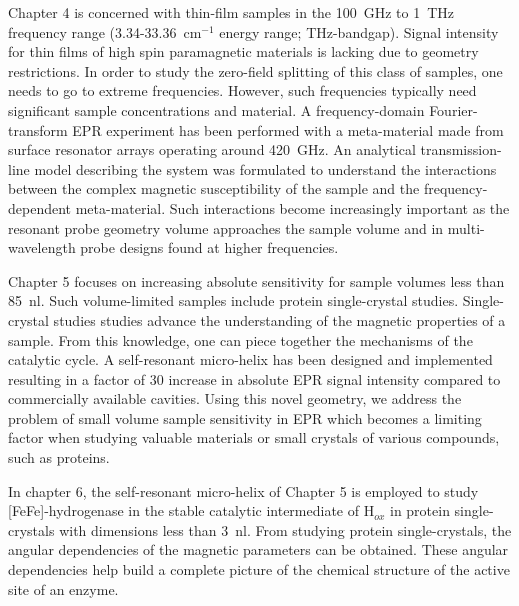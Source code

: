 Chapter 4 is concerned with thin-film samples in the 100~GHz to 1~THz frequency range (3.34-33.36~cm$^{-1}$ energy range; THz-bandgap). Signal intensity for thin films of high spin paramagnetic materials is lacking due to geometry restrictions. In order to study the zero-field splitting of this class of samples, one needs to go to extreme frequencies. However, such frequencies typically need significant sample concentrations and material. A frequency-domain Fourier-transform EPR experiment has been performed with a meta-material made from surface resonator arrays operating around 420~GHz. An analytical transmission-line model describing the system was formulated to understand the interactions between the complex magnetic susceptibility of the sample and the frequency-dependent meta-material. Such interactions become increasingly important as the resonant probe geometry volume approaches the sample volume and in multi-wavelength probe designs found at higher frequencies. 

Chapter 5 focuses on increasing absolute sensitivity for sample volumes less than 85~nl. Such volume-limited samples include protein single-crystal studies. Single-crystal studies studies advance the understanding of the magnetic properties of a sample. From this knowledge, one can piece together the mechanisms of the catalytic cycle. A self-resonant micro-helix has been designed and implemented resulting in a factor of 30 increase in absolute EPR signal intensity compared to commercially available cavities. Using this novel geometry, we address the problem of small volume sample sensitivity in EPR which becomes a limiting factor when studying valuable materials or small crystals of various compounds, such as proteins. 

In chapter 6, the self-resonant micro-helix of Chapter 5 is employed to study [FeFe]-hydrogenase in the stable catalytic intermediate of H$_{ox}$ in protein single-crystals with dimensions less than 3~nl. From studying protein single-crystals, the angular dependencies of the magnetic parameters can be obtained. These angular dependencies help build a complete picture of the chemical structure of the active site of an enzyme.







{\renewcommand{\bibsection}{\clearpage\section*{\bibname}\markboth{\bibname}{\bibname}}
\renewcommand{\bibname}{CHAPTER 1. REFERENCES}


}